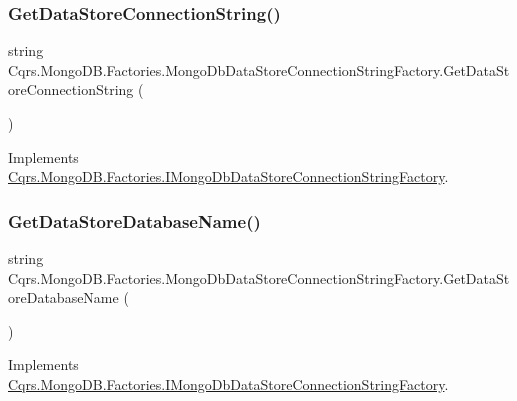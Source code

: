 \subsubsection{\texorpdfstring{Get\+Data\+Store\+Connection\+String()}{GetDataStoreConnectionString()}}
{\footnotesize\ttfamily string Cqrs.\+Mongo\+D\+B.\+Factories.\+Mongo\+Db\+Data\+Store\+Connection\+String\+Factory.\+Get\+Data\+Store\+Connection\+String (\begin{DoxyParamCaption}{ }\end{DoxyParamCaption})}



Implements \hyperlink{interfaceCqrs_1_1MongoDB_1_1Factories_1_1IMongoDbDataStoreConnectionStringFactory_a31cb87fb2cf1435912f635394494ed91_a31cb87fb2cf1435912f635394494ed91}{Cqrs.\+Mongo\+D\+B.\+Factories.\+I\+Mongo\+Db\+Data\+Store\+Connection\+String\+Factory}.

\mbox{\label{classCqrs_1_1MongoDB_1_1Factories_1_1MongoDbDataStoreConnectionStringFactory_ab8729212ac8fe8350dead56fc89a5fd2_ab8729212ac8fe8350dead56fc89a5fd2}} 
\subsubsection{\texorpdfstring{Get\+Data\+Store\+Database\+Name()}{GetDataStoreDatabaseName()}}
{\footnotesize\ttfamily string Cqrs.\+Mongo\+D\+B.\+Factories.\+Mongo\+Db\+Data\+Store\+Connection\+String\+Factory.\+Get\+Data\+Store\+Database\+Name (\begin{DoxyParamCaption}{ }\end{DoxyParamCaption})}



Implements \hyperlink{interfaceCqrs_1_1MongoDB_1_1Factories_1_1IMongoDbDataStoreConnectionStringFactory_aca9921fae4214a9eb22a221825c57363_aca9921fae4214a9eb22a221825c57363}{Cqrs.\+Mongo\+D\+B.\+Factories.\+I\+Mongo\+Db\+Data\+Store\+Connection\+String\+Factory}.



